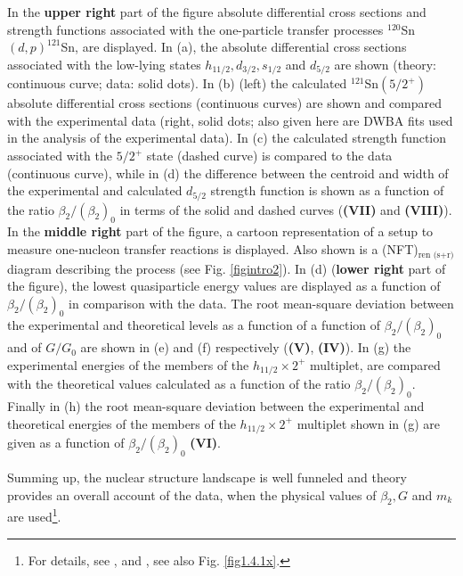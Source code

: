   In the  \textbf{upper right} part of the figure absolute differential cross sections and strength functions associated with the one-particle transfer processes $^{120}$Sn$(d,p)^{121}$Sn, are displayed. In  (a), the absolute differential cross sections associated with the low-lying  states $h_{11/2},d_{3/2},s_{1/2}$ and $d_{5/2}$ are shown (theory: continuous curve; data: solid dots). In (b) (left) the calculated $^{121}$Sn$(5/2^+)$ absolute differential cross sections (continuous curves) are shown and compared with the experimental data (right, solid dots; also given here are DWBA fits used in the analysis of the experimental data). In (c)  the calculated strength function associated with the $5/2^+$ state (dashed curve) is compared to the data (continuous curve), while in  (d) the difference between the centroid and  width of the experimental and calculated $d_{5/2}$ strength function  is shown as a function of the ratio $\beta_2/(\beta_2)_0$ in terms of the solid and dashed curves (\textbf{(VII)} and \textbf{(VIII)}).
    In the \textbf{middle right} part of the figure, a cartoon representation of a setup to measure one-nucleon transfer reactions is displayed. Also shown is a (NFT)$_{\text{ren (s+r)}}$ diagram  describing the process (see Fig. \ref{figintro2}).  In (d)  (\textbf{lower right} part of the figure), the lowest quasiparticle energy values are displayed as a function of $\beta_2/(\beta_2)_0$ in comparison with the data.  The root mean-square deviation between the experimental and theoretical levels as a function of a function of  $\beta_2/(\beta_2)_0$ and  of $G/G_0$ are shown in (e) and (f) respectively (\textbf{(V)}, \textbf{(IV)}). In (g) the  experimental energies of the members of the $h_{11/2}\times 2^+$  multiplet, are compared with the theoretical values calculated as a function of the ratio $\beta_2/(\beta_2)_0$. Finally in (h) the root mean-square deviation between the experimental and theoretical energies of the members of the $h_{11/2}\times 2^+$ multiplet shown in (g) are given as a function of $\beta_2/(\beta_2)_0$ \textbf{(VI)}. 
  
  
  Summing up, the nuclear structure landscape is well funneled and  theory provides an overall account of the data, when the physical values of $\beta_2,G$ and $m_k$ are used\footnote{For details, see \cite{Idini:15}, and \cite{Broglia:16}, see also  Fig. \ref{fig1.4.1x}.}.

